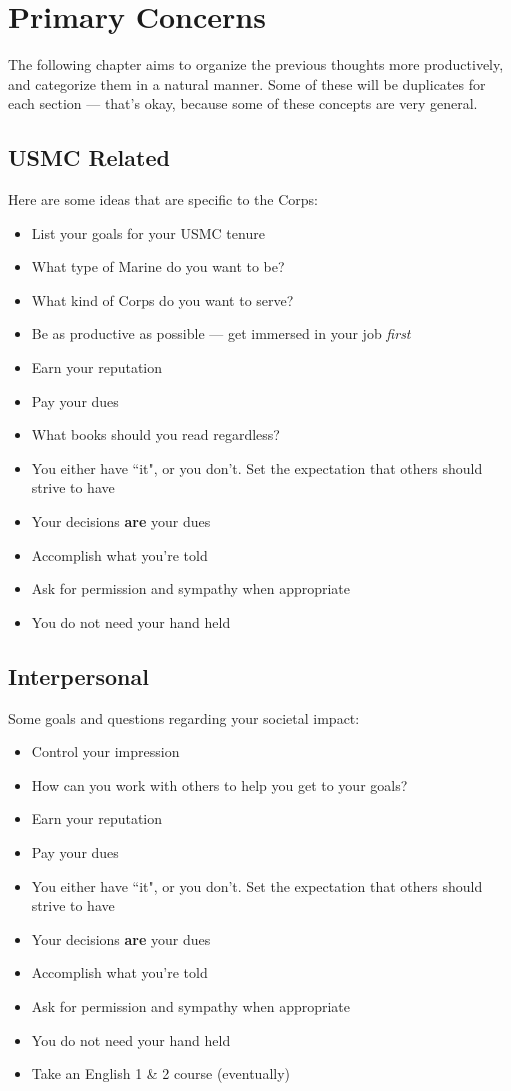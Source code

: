 \chapter{Primary Concerns}

The following chapter aims to organize the previous thoughts more productively,
and categorize them in a natural manner. Some of these will be duplicates for
each section --- that's okay, because some of these concepts are very general.

\section{USMC Related}

Here are some ideas that are specific to the Corps:

\begin{itemize}
\item{List your goals for your USMC tenure}
\item{What type of Marine do you want to be?}
\item{What kind of Corps do you want to serve?}
\item{Be as productive as possible --- get immersed in your job \textit{first}}
\item{Earn your reputation}
\item{Pay your dues}
\item{What books should you read regardless?}
\item{You either have ``it", or you don't. Set the expectation that others should strive to have}
\item{Your decisions \textbf{are} your dues}
\item{Accomplish what you're told}
\item{Ask for permission and sympathy when appropriate}
\item{You do not need your hand held}
\end{itemize}

\section{Interpersonal}

Some goals and questions regarding your societal impact:

\begin{itemize}
\item{Control your impression}
\item{How can you work with others to help you get to your goals?}
\item{Earn your reputation}
\item{Pay your dues}
\item{You either have ``it", or you don't. Set the expectation that others should strive to have}
\item{Your decisions \textbf{are} your dues}
\item{Accomplish what you're told}
\item{Ask for permission and sympathy when appropriate}
\item{You do not need your hand held}
\item{Take an English 1 \& 2 course (eventually)}
\end{itemize}

